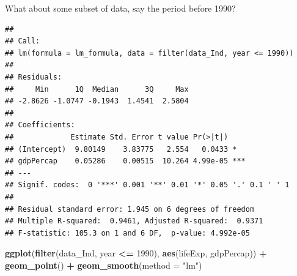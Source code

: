 \documentclass[12pt,]{article}
\newenvironment{Shaded}{\begin{snugshade}}{\end{snugshade}}
\newcommand{\KeywordTok}[1]{\textcolor[rgb]{0.13,0.29,0.53}{\textbf{#1}}}
\newcommand{\DataTypeTok}[1]{\textcolor[rgb]{0.13,0.29,0.53}{#1}}
\newcommand{\DecValTok}[1]{\textcolor[rgb]{0.00,0.00,0.81}{#1}}
\newcommand{\StringTok}[1]{\textcolor[rgb]{0.31,0.60,0.02}{#1}}
\newcommand{\OperatorTok}[1]{\textcolor[rgb]{0.81,0.36,0.00}{\textbf{#1}}}
\newcommand{\NormalTok}[1]{#1}
\begin{document}
What about some subset of data, say the period before 1990?

\begin{Shaded}
\end{Shaded}

\begin{verbatim}
## 
## Call:
## lm(formula = lm_formula, data = filter(data_Ind, year <= 1990))
## 
## Residuals:
##     Min      1Q  Median      3Q     Max 
## -2.8626 -1.0747 -0.1943  1.4541  2.5804 
## 
## Coefficients:
##             Estimate Std. Error t value Pr(>|t|)    
## (Intercept)  9.80149    3.83775   2.554   0.0433 *  
## gdpPercap    0.05286    0.00515  10.264 4.99e-05 ***
## ---
## Signif. codes:  0 '***' 0.001 '**' 0.01 '*' 0.05 '.' 0.1 ' ' 1
## 
## Residual standard error: 1.945 on 6 degrees of freedom
## Multiple R-squared:  0.9461, Adjusted R-squared:  0.9371 
## F-statistic: 105.3 on 1 and 6 DF,  p-value: 4.992e-05
\end{verbatim}

\begin{Shaded}
\begin{Highlighting}[]
\KeywordTok{ggplot}\NormalTok{(}\KeywordTok{filter}\NormalTok{(data_Ind, year }\OperatorTok{<=}\StringTok{ }\DecValTok{1990}\NormalTok{), }\KeywordTok{aes}\NormalTok{(lifeExp, gdpPercap)) }\OperatorTok{+}
\StringTok{  }\KeywordTok{geom_point}\NormalTok{() }\OperatorTok{+}
\StringTok{  }\KeywordTok{geom_smooth}\NormalTok{(}\DataTypeTok{method =} \StringTok{"lm"}\NormalTok{)}
\end{Highlighting}
\end{Shaded}
\end{document}

